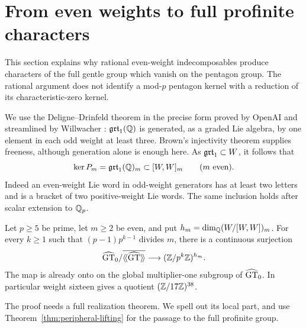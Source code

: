 \section{From even weights to full profinite characters}\label{sec:characters}
This section explains why rational even-weight indecomposables produce
characters of the full gentle group which vanish on the pentagon group.
The rational argument does not identify a mod-$p$ pentagon kernel with a
reduction of its characteristic-zero kernel.

We use the Deligne--Drinfeld theorem in the precise form proved by
OpenAI and streamlined by Willwacher \cite[Theorem 1.1 and the discussion
of (7), pp.~1--2]{Willwacher}: $\mathfrak{grt}_1(\mathbb Q)$ is generated, as a graded Lie
algebra, by one element in each odd weight at least three.  Brown's
injectivity theorem supplies freeness, although generation alone is enough
here.  As $\mathfrak{grt}_1\subset W$, it follows that
\begin{equation}
 \ker P_m=\mathfrak{grt}_1(\mathbb Q)_m\subset[W,W]_m
       \qquad(m\text{ even}).\label{eq:even-pentagon}
\end{equation}
Indeed an even-weight Lie word in odd-weight generators has at least two
letters and is a bracket of two positive-weight Lie words.  The same
inclusion holds after scalar extension to $\mathbb Q_p$.

\begin{theorem}\label{thm:even-characters}
Let $p\geq5$ be prime, let $m\geq2$ be even, and put
$h_m=\dim_\mathbb Q(W/[W,W])_m$.  For every $k\geq1$ such that
$(p-1)p^{k-1}$ divides $m$, there is a continuous surjection
\[
 \widehat{\mathrm{GT}}_0/\overline{\langle\!\langle\widehat{\mathrm{GT}}\rangle\!\rangle}
       \longrightarrow(\mathbb Z/p^k\mathbb Z)^{h_m}.
\]
The map is already onto on the global multiplier-one subgroup of $\widehat{\mathrm{GT}}_0$.
In particular weight sixteen gives a quotient $(\mathbb Z/17\mathbb Z)^{38}$.
\end{theorem}

The proof needs a full realization theorem.  We spell out its local
part, and use Theorem~\ref{thm:peripheral-lifting} for the passage to
the full profinite group.

